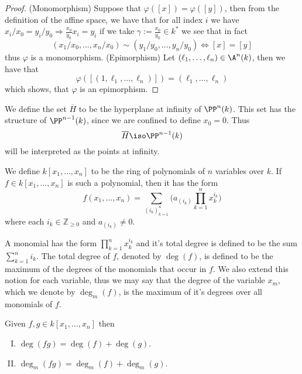 \begin{proof}
   (Monomorphism) Suppose that \(\varphi([x]) = \varphi([y])\), then from the
   definition of the affine space, we have that for all index \(i\) we have
   \(x_i/x_0 = y_i/y_0 \Rightarrow \frac{x_0}{y_0}x_i = y_i\) if we take
   \(\gamma := \frac{x_0}{y_0} \in k^\ast\) we see that in fact 
    \[
       (x_1/x_0,\dots,x_n/x_0) \sim (y_1/y_0,\dots,y_n/y_0) \Leftrightarrow [x]
       = [y]
   \] 
   thus \(\varphi\) is a monomorphism.
   (Epimorphism) Let \((\ell_1, \dots, \ell_n) \in \A^n(k)\), then we have that
   \[\varphi\left(\left[(1, \ell_1, \dots, \ell_n)\right]\right) =
   (\ell_1,\dots,\ell_n)\] which shows, that  \(\varphi\) is an epimorphism.
\end{proof}

\begin{definition}[Hyperplane]
   We define the set \(\overline{H}\) to be the hyperplane at infinity of
   \(\PP^n(k)\). This set has the structure of \(\PP^{n-1}(k)\), since we are
   confined to define \(x_0 = 0\). Thus 
   \[
      \overline{H} \iso \PP^{n-1}(k)
   \] 
   will be interpreted as the points at infinity.
\end{definition}

\begin{definition}
   We define \(k[x_1, \dots, x_n]\) to be the ring of polynomials of \(n\)
   variables over \(k\). If  \(f \in k[x_1, \dots, x_n]\) is such a polynomial,
   then it has the form
   \[
      f(x_1, \dots, x_n) = \sum_{(i_k)_{k=1}^n} \bigg(a_{(i_k)} \prod_{k = 1}^n
      x_k^{i_k}\bigg)
   \] 
   where each \(i_k \in \mathbb{Z}_{\geqslant 0}\) and \(a_{(i_k)} \neq 0\).

   A monomial has the form \(\prod_{k=1}^n x_k^{i_k}\) and it's total degree is
   defined to be the sum \(\sum_{k=1}^n i_k\). The total degree of \(f\),
   denoted by \(\deg(f)\), is defined to be the maximum of the degrees of the
   monomials that occur in \(f\). We also extend this notion for each variable,
   thus we may say that the degree of the variable \(x_m\), which we denote by
   \(\deg_m(f)\), is the maximum of it's degrees over all monomials of \(f\).
\end{definition}

\begin{corollary}
   Given \(f, g \in k[x_1, \dots, x_n]\) then
   \begin{enumerate}[I.]
      \item \(\deg(fg) = \deg(f) + \deg(g)\).
      \item  \(\deg_m(fg) = \deg_m(f) + \deg_m(g)\).
   \end{enumerate}
\end{corollary}

